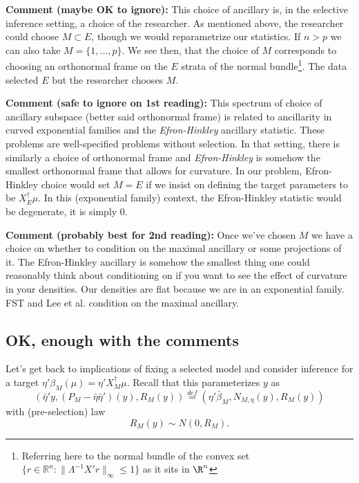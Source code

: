 \documentclass{article}
\newcommand{\OLS}{\bar{\beta}}
\begin{document}
        {\bf Comment (maybe OK to ignore):} This choice of ancillary
        is, in the selective inference setting, a choice of the
        researcher. As mentioned above, the researcher could choose $M
        \subset E$, though we would reparametrize our statistics. If
        $n>p$ we can also take $M=\{1, \dots, p\}$.  We see then, that
        the choice of $M$ corresponds to choosing an orthonormal frame
        on the $E$ strata of the normal bundle\footnote{Referring here
        to the normal bundle of the convex set $\{r \in \mathbb{R}^n:
        \|\Lambda^{-1}X'r\|_{\infty} \leq 1\}$ as it sits in $\R^n$}. The data
        selected $E$ but the researcher chooses $M$.

        {\bf Comment (safe to ignore on 1st reading):} This spectrum of choice of
        ancillary subspace (better said orthonormal frame) is related
        to ancillarity in curved exponential families and the {\em
          Efron-Hinkley} ancillary statistic. These problems are
          well-specified problems without selection.  In that setting,
          there is similarly a choice of orthonormal frame and {\em
            Efron-Hinkley} is somehow the smallest orthonormal frame
          that allows for curvature. In our problem, Efron-Hinkley
          choice would set $M=E$ if we insist on defining the target
          parameters to be $X_E^{\dagger}\mu$. In this (exponential
          family) context, the Efron-Hinkley statistic would be
          degenerate, it is simply 0.

          {\bf Comment (probably best for 2nd reading):} Once we've
          chosen $M$ we have a choice on whether to condition on the
          maximal ancillary or some projections of it. The
          Efron-Hinkley ancillary is somehow the smallest thing one
          could reasonably think about conditioning on if you want to
          see the effect of curvature in your densities. Our densities
          are flat because we are in an exponential family. FST and
          Lee et al. condition on the maximal ancillary.

          \subsection{OK, enough with the comments}
        
          Let's get back to implications of fixing a selected model and consider
          inference for a target $\eta'\beta_M(\mu)=\eta'X_M^{\dagger}\mu$.
          Recall that this parameterizes $y$ as
          $$ \left(\bar{\eta}'y, (P_M-\bar{\eta}\bar{\eta}')(y), R_M(y)\right)
          \overset{def}{=} (\eta'\OLS_M, N_{M,\eta}(y), R_M(y))
          $$ with (pre-selection) law
          $$ R_M(y) \sim N(0, R_M).
          $$
\end{document}
